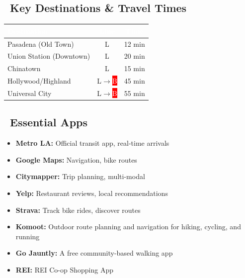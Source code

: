 \documentclass[10pt,letterpaper]{article}
\begin{document}
\subsection*{\faClock\ Key Destinations \& Travel Times}

\begin{small}
\begin{tabularx}{\textwidth}{|X|c|c|}
\hline
\rowcolor{primary!80}\textcolor{white}{\textbf{Destination}} & \textcolor{white}{\textbf{Line}} & \textcolor{white}{\textbf{Time}} \\
\hline
Pasadena (Old Town) & \colorbox{yellow!80}{L} & 12 min \\
\hline
Union Station (Downtown) & \colorbox{yellow!80}{L} & 20 min \\
\hline
Chinatown & \colorbox{yellow!80}{L} & 15 min \\
\hline
Hollywood/Highland & \colorbox{yellow!80}{L}$\rightarrow$\colorbox{red}{\textcolor{white}{B}} & 45 min \\
\hline
Universal City & \colorbox{yellow!80}{L}$\rightarrow$\colorbox{red}{\textcolor{white}{B}} & 55 min \\
\hline
\end{tabularx}
\end{small}

\subsection*{\faMobile\ Essential Apps}

\begin{small}
\begin{itemize}[leftmargin=0.2in,itemsep=1pt]
\item \textbf{Metro LA:} Official transit app, real-time arrivals
\item \textbf{Google Maps:} Navigation, bike routes
\item \textbf{Citymapper:} Trip planning, multi-modal
\item \textbf{Yelp:} Restaurant reviews, local recommendations
\item \textbf{Strava:} Track bike rides, discover routes
\item \textbf{Komoot:} Outdoor route planning and navigation for hiking, cycling, and running
\item \textbf{Go Jauntly:} A free community-based walking app
\item \textbf{REI:} REI Co-op Shopping App
\end{itemize}
\end{small}
\end{document}
